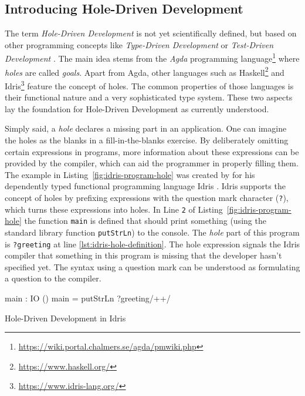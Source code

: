 \subsection{Introducing Hole-Driven Development}
\label{sec:introducing-hole-driven-development}

The term \emph{Hole-Driven Development} is not yet scientifically defined, but based on other programming concepts like \emph{Type-Driven Development} \cite{brady_type-driven_2017} or \emph{Test-Driven Development} \cite{mccracken_digital_1957}.
The main idea stems from the \emph{Agda} programming language\footnote{\url{https://wiki.portal.chalmers.se/agda/pmwiki.php}} where \emph{holes} are called \emph{goals}.
Apart from Agda, other languages such as Haskell\footnote{\url{https://www.haskell.org/}} and Idris\footnote{\url{https://www.idris-lang.org/}} feature the concept of holes.
The common properties of those languages is their functional nature and a very sophisticated type system.
These two aspects lay the foundation for Hole-Driven Development as currently understood.

Simply said, a \emph{hole} declares a missing part in an application.
One can imagine the holes as the blanks in a fill-in-the-blanks exercise.
By deliberately omitting certain expressions in programs, more information about these expressions can be provided by the compiler, which can aid the programmer in properly filling them.
The example in Listing~\ref{fig:idris-program-hole} was created by \citeauthor{brady_type-driven_2017} for his dependently typed functional programming language Idris \cite{brady_type-driven_2017}.
Idris supports the concept of holes by prefixing expressions with the question mark character (\texttt{?}), which turns these expressions into holes.
In Line \verb|2| of Listing~\ref{fig:idris-program-hole} the function \verb|main| is defined that should print something (using the standard library function \verb|putStrLn|) to the console.
The \emph{hole} part of this program is \verb|?greeting| at line \ref{lst:idris-hole-definition}.
The hole expression signals the Idris compiler that something in this program is missing that the developer hasn't specified yet.
The syntax using a question mark can be understood as formulating a question to the compiler.

\begin{program}
\begin{GenericCode}
main : IO ()
main = putStrLn ?greeting/+\label{lst:idris-hole-definition}+/
\end{GenericCode}
\caption{Hole-Driven Development in Idris}
\label{fig:idris-program-hole}
\end{program}

